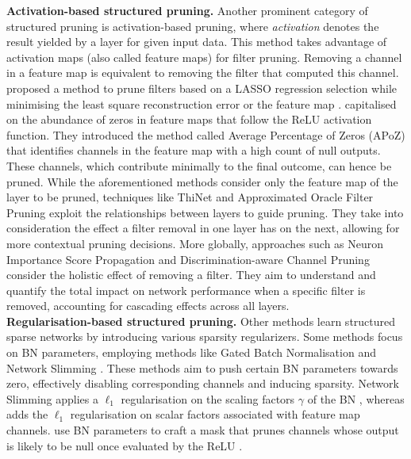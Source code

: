 \noindent\textbf{Activation-based structured pruning.} Another prominent
category of structured pruning is activation-based pruning, where
\emph{activation} denotes the result yielded by a layer for given input data.
This method takes advantage of activation maps (also called feature maps) for
filter pruning. Removing a channel in a feature map is equivalent to removing
the filter that computed this channel. \citeauthor{DBLP:conf/iccv/HeZS17}
proposed a method to prune filters based on a LASSO regression selection while
minimising the least square reconstruction error or the feature map
\cite{DBLP:conf/iccv/HeZS17}. \citeauthor{DBLP:journals/corr/HuPTT16}
capitalised on the abundance of zeros in feature maps that follow the \ac{ReLU}
activation function. They introduced the method called Average Percentage of
Zeros (APoZ) that identifies channels in the feature map with a high count of
null outputs. These channels, which contribute minimally to the final outcome,
can hence be pruned. While the aforementioned methods consider only the feature
map of the layer to be pruned, techniques like ThiNet
\cite{DBLP:conf/iccv/LuoWL17} and Approximated Oracle Filter Pruning
\cite{DBLP:conf/icml/DingDGHY19} exploit the relationships between layers to
guide pruning. They take into consideration the effect a filter removal in one
layer has on the next, allowing for more contextual pruning decisions. More
globally, approaches such as Neuron Importance Score Propagation
\cite{DBLP:conf/cvpr/Yu00LMHGLD18} and Discrimination-aware Channel Pruning
\cite{DBLP:conf/nips/ZhuangTZLGWHZ18} consider the holistic effect of removing a
filter. They aim to understand and quantify the total impact on network
performance when a specific filter is removed, accounting for cascading effects
across all layers.\\

\noindent \textbf{Regularisation-based structured pruning.} Other methods learn
structured sparse networks by introducing various sparsity regularizers. Some
methods focus on \acl{BN} parameters, employing methods like Gated Batch
Normalisation \cite{DBLP:conf/nips/YouYYM019} and Network Slimming
\cite{DBLP:conf/iccv/LiuLSHYZ17}. These methods aim to push certain BN
parameters towards zero, effectively disabling corresponding channels and
inducing sparsity. Network Slimming applies a $\ell_1$ regularisation on the
scaling factors $\gamma$ of the \ac{BN} \cite{DBLP:conf/iccv/LiuLSHYZ17},
whereas \cite{DBLP:conf/nips/YouYYM019} adds the $\ell_1$ regularisation on
scalar factors associated with feature map channels.
\citeauthor{DBLP:conf/icml/KangH20} use \ac{BN} parameters to craft a mask that
prunes channels whose output is likely to be null once evaluated by the
\ac{ReLU} \cite{DBLP:conf/icml/KangH20}. \\

